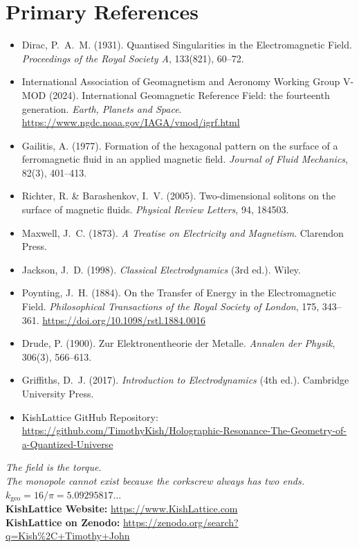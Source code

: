 \documentclass[11pt, letterpaper, openany]{book}
\begin{document}
\section*{Primary References}
\begin{itemize}
    \item Dirac, P.~A.~M. (1931). Quantised Singularities in the
    Electromagnetic Field. \textit{Proceedings of the Royal Society A},
    133(821), 60--72.

    \item International Association of Geomagnetism and Aeronomy
    Working Group V-MOD (2024). International Geomagnetic Reference
    Field: the fourteenth generation. \textit{Earth, Planets and Space}.
    \url{https://www.ngdc.noaa.gov/IAGA/vmod/igrf.html}

    \item Gailitis, A. (1977). Formation of the hexagonal pattern on
    the surface of a ferromagnetic fluid in an applied magnetic field.
    \textit{Journal of Fluid Mechanics}, 82(3), 401--413.

    \item Richter, R. \& Barashenkov, I.~V. (2005). Two-dimensional
    solitons on the surface of magnetic fluids.
    \textit{Physical Review Letters}, 94, 184503.

    \item Maxwell, J.~C. (1873). \textit{A Treatise on Electricity
    and Magnetism}. Clarendon Press.

    \item Jackson, J.~D. (1998). \textit{Classical Electrodynamics}
    (3rd ed.). Wiley.

    \item Poynting, J.~H. (1884). On the Transfer of Energy in the
    Electromagnetic Field. \textit{Philosophical Transactions of the
    Royal Society of London}, 175, 343--361.
    \url{https://doi.org/10.1098/rstl.1884.0016}

    \item Drude, P. (1900). Zur Elektronentheorie der Metalle.
    \textit{Annalen der Physik}, 306(3), 566--613.

    \item Griffiths, D.~J. (2017). \textit{Introduction to
    Electrodynamics} (4th ed.). Cambridge University Press.


    \item KishLattice GitHub Repository:
    \url{https://github.com/TimothyKish/Holographic-Resonance-The-Geometry-of-a-Quantized-Universe}
\end{itemize}

\vfill
\begin{center}
\large
\textit{The field is the torque.}\\
\textit{The monopole cannot exist because the corkscrew always has two ends.}\\[1em]
\normalsize
$k_{\text{geo}} = 16/\pi = 5.09295817\ldots$\\[0.5em]
\small
\textbf{KishLattice Website:} \url{https://www.KishLattice.com}\\
\textbf{KishLattice on Zenodo:}
\url{https://zenodo.org/search?q=Kish\%2C+Timothy+John}
\end{center}
\end{document}
